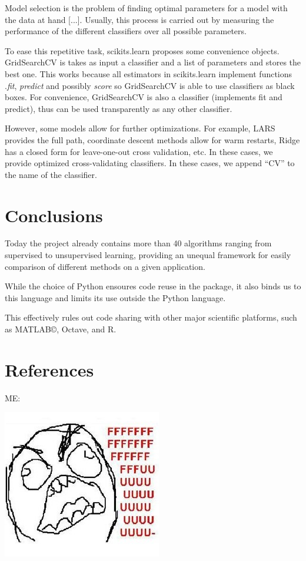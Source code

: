 \documentclass[twoside,11pt]{article}
\begin{document}
Model selection is the problem of finding optimal parameters for a
model with the data at hand [...]. Usually, this process is carried
out by measuring the performance of the different classifiers over all
possible parameters.

To ease this repetitive task, scikits.learn proposes some convenience
objects. GridSearchCV is takes as input a classifier and a list of
parameters and stores the best one. This works because all estimators
in scikits.learn implement functions .\emph{fit}, \emph{predict} and
possibly \emph{score} so GridSearchCV is able to use classifiers as
black boxes. For convenience, GridSearchCV is also a classifier
(implements fit and predict), thus can be used transparently as any
other classifier.

However, some models allow for further optimizations. For example,
LARS provides the full path, coordinate descent methods allow for warm
restarts, Ridge has a closed form for leave-one-out cross validation,
etc. In these cases, we provide optimized cross-validating
classifiers. In these cases, we append ``CV'' to the name of the
classifier.



\section{Conclusions}

Today the project already contains more than 40 algorithms ranging
from supervised to unsupervised learning, providing an unequal
framework for easily comparison of different methods on a given
application.

While the choice of Python ensoures code reuse in the package, it also
binds us to this language and limits its use outside the Python
language.

This effectively rules out code sharing with other major scientific
platforms, such as MATLAB©, Octave, and R.



\section{References}

ME:

\includegraphics{images/parafaber.jpg}
\end{document}
